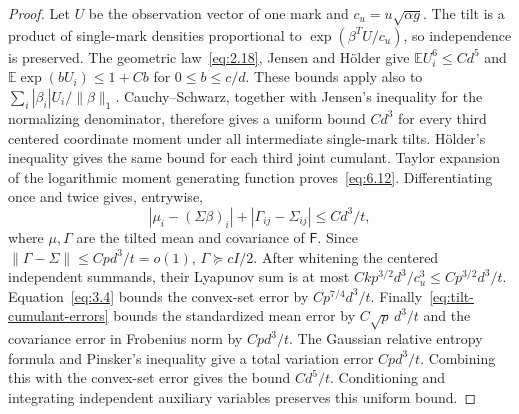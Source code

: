 \documentclass[11pt,letterpaper,reqno]{amsart}
\numberwithin{equation}{section}
\theoremstyle{remark}
\begin{document}
\begin{proof}
Let $U$ be the observation vector of one mark and $c_u=u\sqrt{\alpha g}$.
The tilt is a product of single-mark densities proportional to
$\exp(\beta^TU/c_u)$, so independence is preserved. The geometric law~\eqref{eq:2.18}, Jensen and H\"older give
$\mathbb E U_i^6\le Cd^5$ and
$\mathbb E\exp(bU_i)\le1+Cb$ for $0\le b\le c/d$.
These bounds apply also to $\sum_i|\beta_i|U_i/\|\beta\|_1$.
Cauchy--Schwarz, together with Jensen's inequality for the normalizing denominator, therefore gives a uniform bound $Cd^3$ for every third centered coordinate moment under all intermediate single-mark tilts. H\"older's inequality gives the same bound for each third joint cumulant. Taylor expansion of the logarithmic moment generating function proves~\eqref{eq:6.12}. Differentiating once and twice gives, entrywise,
\begin{equation}\label{eq:tilt-cumulant-errors}
|\mu_i-(\Sigma\beta)_i|+|\Gamma_{ij}-\Sigma_{ij}|
\le Cd^3/t,
\end{equation}
where $\mu,\Gamma$ are the tilted mean and covariance of $\mathsf F$.
Since $\|\Gamma-\Sigma\|\le Cpd^3/t=o(1)$, $\Gamma\succeq cI/2$.
After whitening the centered independent summands, their Lyapunov sum is at most
$Ckp^{3/2}d^3/c_u^3\le Cp^{3/2}d^3/t$.
Equation~\eqref{eq:3.4} bounds the convex-set error by
$Cp^{7/4}d^3/t$.
Finally~\eqref{eq:tilt-cumulant-errors} bounds the standardized mean error by
$C\sqrt p\,d^3/t$ and the covariance error in Frobenius norm by $Cpd^3/t$.
The Gaussian relative entropy formula and Pinsker's inequality give a total variation error $Cpd^3/t$. Combining this with the convex-set error gives the bound $Cd^5/t$.
Conditioning and integrating independent auxiliary variables preserves this uniform bound.
\end{proof}
\end{document}
